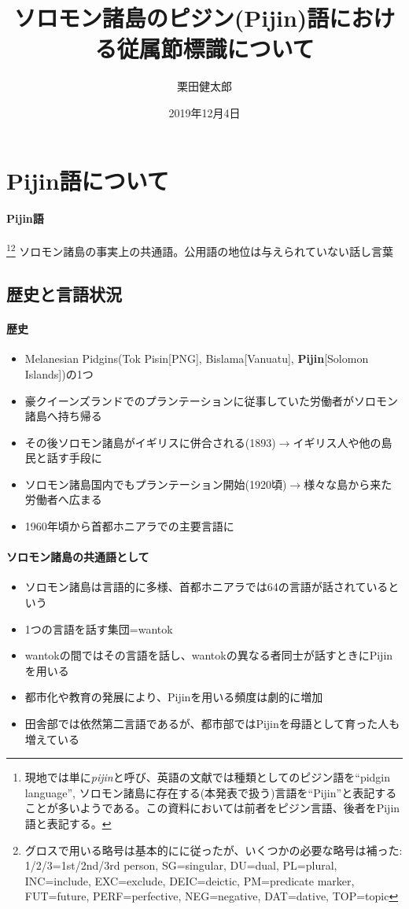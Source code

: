 \documentclass[11pt,a4paper]{jsarticle}
\title{\fontsize{16pt}{0pt}\selectfont ソロモン諸島のピジン(Pijin)語における従属節標識について}
\author{栗田健太郎}
\date{2019年12月4日}
\begin{document}
\maketitle
\section{Pijin語について}
\paragraph{Pijin語}\footnote{現地では単に\textit{pijin}と呼び、英語の文献では種類としてのピジン語を``pidgin language'', ソロモン諸島に存在する(本発表で扱う)言語を``Pijin''と表記することが多いようである。この資料においては前者をピジン言語、後者をPijin語と表記する。}\footnote{グロスで用いる略号は基本的に\cite{prepositions}に従ったが、いくつかの必要な略号は補った: 1/2/3=1st/2nd/3rd person, SG=singular, DU=dual, PL=plural, INC=include, EXC=exclude, DEIC=deictic, PM=predicate marker, FUT=future, PERF=perfective, NEG=negative, DAT=dative, TOP=topic} ソロモン諸島の事実上の共通語。公用語の地位は与えられていない話し言葉

\subsection{歴史と言語状況}
\cite{phonology}
\paragraph{歴史}
\begin{itemize}
  \item Melanesian Pidgins(Tok Pisin[PNG], Bislama[Vanuatu], \textbf{Pijin}[Solomon Islands])の1つ
  \item 豪クイーンズランドでのプランテーションに従事していた労働者がソロモン諸島へ持ち帰る
  \item その後ソロモン諸島がイギリスに併合される(1893)$\rightarrow$イギリス人や他の島民と話す手段に
  \item ソロモン諸島国内でもプランテーション開始(1920頃)$\rightarrow$様々な島から来た労働者へ広まる
  \item 1960年頃から首都ホニアラでの主要言語に
\end{itemize}

\paragraph{ソロモン諸島の共通語として}
\begin{itemize}
  \item ソロモン諸島は言語的に多様、首都ホニアラでは64の言語が話されているという
  \item 1つの言語を話す集団=wantok
  \item wantokの間ではその言語を話し、wantokの異なる者同士が話すときにPijinを用いる
  \item 都市化や教育の発展により、Pijinを用いる頻度は劇的に増加
  \item 田舎部では依然第二言語であるが、都市部ではPijinを母語として育った人も増えている
\end{itemize}
\end{document}

